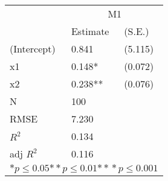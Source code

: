 \begin{tabular}{*{3}{l}}
\hline
                  & \multicolumn{2}{c}{M1}   \tabularnewline
                   &Estimate  &(S.E.)  \tabularnewline
 \hline
 \hline
   (Intercept)     &0.841   &   (5.115) \tabularnewline
   x1              &0.148*   &   (0.072) \tabularnewline
   x2              &0.238**   &   (0.076) \tabularnewline
 \hline
 N                 &100       &        \tabularnewline
 RMSE             &7.230         & \tabularnewline
 $R^2$             &0.134         & \tabularnewline
 adj $R^2$         &0.116         & \tabularnewline
 \hline
\hline
 
 \multicolumn{3}{c}{${*  p}\le 0.05$${*\!\!*  p}\le 0.01$${*\!\!*\!\!*  p}\le 0.001$}\tabularnewline
 \end{tabular}